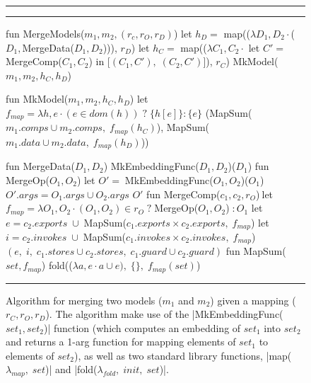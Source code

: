 
\begin{figure}[ht]
\hrule\hrule
\centering
  \begin{slangmath}[numbers=left,emph={MergeModels, MkMap, MkModel,%
                    MergeData, MergeComp, MergeOp, MapSum}]
fun MergeModels($m_1, m_2, (r_c,r_O,r_D)$)
  let $h_D=$ map(($\lambda D_1,D_2 \cdot$($D_1,$MergeData($D_1, D_2$))), $r_D$)
  let $h_C=$ map(($\lambda C_1,C_2 \cdot$ let $C'=\; $MergeComp($C_1, C_2$) in [$(C_1, C'),\; (C_2, C')$]), $r_C$)
  MkModel($m_1, m_2, h_C, h_D$)

fun MkModel($m_1, m_2, h_C, h_D$)
  let $f_{map} = \lambda h,e \cdot (e \in dom(h)) \;?\; \{h[e]\} : \{e\}$
  (MapSum($m_1.comps \cup m_2.comps,\; f_{map}(h_C)$), MapSum($m_1.data \cup m_2.data,\; f_{map}(h_D)$))

fun MergeData($D_1, D_2$)       \eqv MkEmbeddingFunc($D_1, D_2$)($D_1$)
fun MergeOp($O_1, O_2$)         \eqv let $O'=\; $MkEmbeddingFunc($O_1, O_2$)($O_1$)
                        $O'.args= O_1.args \cup O_2.args$ 
                        $O'$
fun MergeComp($c_1, c_2, r_O$)$\:$\eqv let $f_{map} = \lambda O_1,O_2 \cdot (O_1,O_2)\in r_O\;?\;$MergeOp($O_1,O_2$)$\;: O_1$
                        let $e = c_2.exports\;\cup\;$MapSum($c_1.exports \times c_2.exports,\; f_{map}$)
                        let $i = c_2.invokes\;\cup\;$MapSum($c_1.invokes \times c_2.invokes,\; f_{map}$)
                        $(e,\; i,\; c_1.stores \cup c_2.stores,\; c_1.guard \cup c_2.guard)$
fun MapSum($set, f_{map}$)          \eqv fold(($\lambda a, e \cdot a \cup e),\; \{\},\; f_{map}(set)$)
  \end{slangmath}
\hrule\vskip7pt
\caption{Algorithm for merging two models ($m_1$ and $m_2$) given a
  mapping ($r_C, r_O, r_D$).  The algorithm make use of the
  \slangmathinscript|MkEmbeddingFunc($set_1, set_2$)| function (which
  computes an embedding of $set_1$ into $set_2$ and returns a 1-arg
  function for mapping elements of $set_1$ to elements of $set_2$), as
  well as two standard library functions,
  \slangmathinscript|map($\lambda_{map},\; set$)| and
  \slangmathinscript|fold($\lambda_{fold},\; init,\; set$)|.}
\label{fig-mergingin-alg-func}
\end{figure}
